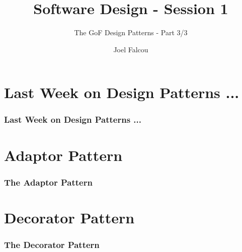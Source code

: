 \documentclass{beamer}
\title{Software Design - Session 1}
\subtitle{The GoF Design Patterns - Part 3/3}
\author{Joel Falcou}
\institute{Laboratoire de Recherche en Informatique - Université Paris Sud 11}
\date{}
\begin{document}
\section{Last Week on Design Patterns ...}
\frame
{
  \frametitle{Last Week on Design Patterns ...}
}

\frame{}

\section{Adaptor Pattern}
\frame
{
  \frametitle{The Adaptor Pattern}
}

\frame
{

}

\section{Decorator Pattern}
\frame
{
  \frametitle{The Decorator Pattern}
}

\frame{}
\end{document}
